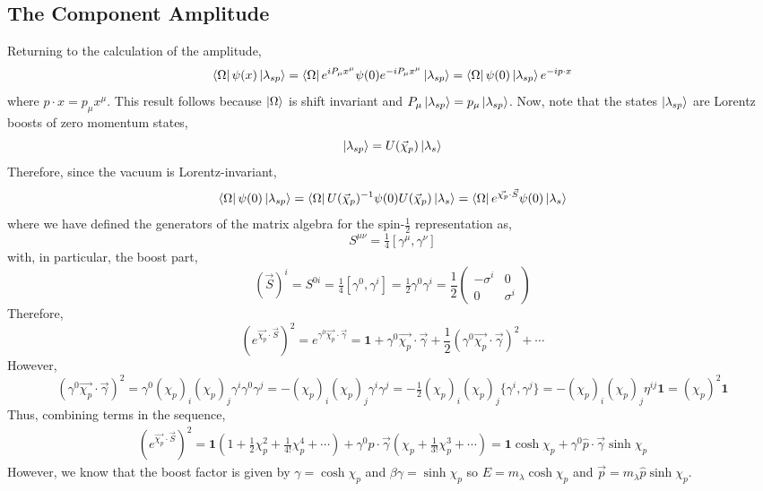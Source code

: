 \documentclass[12pt]{article}
\begin{document}
\subsection{The Component Amplitude}
Returning to the calculation of the amplitude,
\[  \left< \Omega \right| \psi(x) \left| \lambda_{s p} \right> = \left< \Omega \right| e^{i P_\mu x^\mu} \psi(0) e^{- i P_{\mu} x^\mu}  \left| \lambda_{sp} \right> =  \left< \Omega \right|  \psi(0)  \left| \lambda_{sp} \right> e^{- i p \cdot x} \]
where $p \cdot x = p_\mu x^\mu$. This result follows because $\left| \Omega \right>$ is shift invariant and $P_\mu \left| \lambda_{sp} \right> = p_\mu \left| \lambda_{sp} \right>$. 
Now, note that the states $\left| \lambda_{sp} \right>$ are Lorentz boosts of zero momentum states,
\[ \left| \lambda_{sp} \right> = U(\vec{\chi}_p) \left| \lambda_s \right> \]
Therefore, since the vacuum is Lorentz-invariant,
\[  \left< \Omega \right| \psi(0) \left| \lambda_{s p} \right> = \left< \Omega \right| U(\vec{\chi}_p)^{-1}  \psi(0) U(\vec{\chi}_p) \left| \lambda_{s} \right> = \left< \Omega \right| e^{\vec{\chi_p} \cdot \vec{S}} \psi(0)  \left| \lambda_{s} \right> \]
where we have defined the generators of the matrix algebra for the spin-$\tfrac{1}{2}$ representation as,
\[ S^{\mu \nu} = \tfrac{1}{4} [ \gamma^\mu, \gamma^\nu ] \]
with, in particular, the boost part,
\[ (\vec{S})^i = S^{0i} = \tfrac{1}{4} [ \gamma^0, \gamma^i] = \tfrac{1}{2} \gamma^0 \gamma^i = \frac{1}{2}
\begin{pmatrix}
- \sigma^i & 0 \\
0 & \sigma^i
\end{pmatrix}\]
Therefore, 
\[ (e^{\vec{\chi_p} \cdot \vec{S}})^2 = e^{\gamma^0 \vec{\chi_p} \cdot \vec{\gamma}} = \mathbf{1} + \gamma^0 \vec{\chi_p} \cdot \vec{\gamma} + \frac{1}{2} (\gamma^0 \vec{\chi_p} \cdot \vec{\gamma})^2 + \cdots \]
However,
\[ (\gamma^0 \vec{\chi_p} \cdot \vec{\gamma})^2 = \gamma^0 (\chi_p)_i (\chi_p)_j \gamma^i \gamma^0 \gamma^j = - (\chi_p)_i (\chi_p)_j \gamma^i \gamma^j = - \tfrac{1}{2} (\chi_p)_i (\chi_p)_j \{ \gamma^i, \gamma^j \} = - (\chi_p)_i (\chi_p)_j \eta^{i j} \mathbf{1} = (\chi_p)^2 \mathbf{1} \]
Thus, combining terms in the sequence,
\begin{align*}
(e^{\vec{\chi_p} \cdot \vec{S}})^2 = \mathbf{1} ( 1 + \tfrac{1}{2} \chi_p^2 + \tfrac{1}{4!} \chi_p^4 + \cdots) + \gamma^0 \hat{p} \cdot \vec{\gamma} (\chi_p + \tfrac{1}{3!} \chi_p^3 + \cdots) = \mathbf{1} \cosh{\chi_p} + \gamma^0 \hat{p} \cdot \vec{\gamma} \sinh{\chi_p} 
\end{align*}
However, we know that the boost factor is given by $\gamma = \cosh{\chi_p}$ and $\beta \gamma = \sinh{\chi_p}$ so $E = m_\lambda \cosh{\chi_p}$ and $\vec{p} = m_\lambda \hat{p} \sinh{\chi_p}$.
\end{document}
